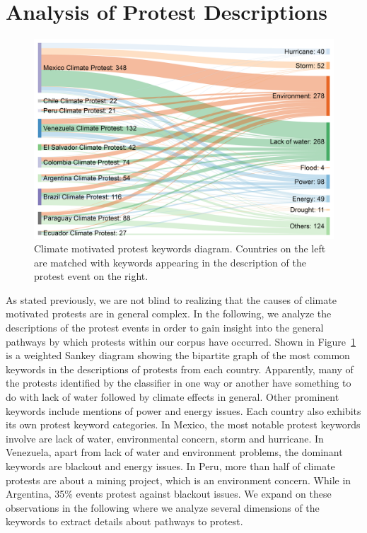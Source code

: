 \documentclass[9pt,twocolumn,twoside]{pnas-new}
\begin{document}
\section{Analysis of Protest Descriptions}
\begin{figure}[t]
\centerline
{\includegraphics[width=.4\textwidth]{figures/causality1}}
\caption{Climate motivated protest keywords diagram. Countries on the left are matched with keywords appearing in the description of the protest event on the right.}
\label{causality}
\end{figure}


As stated previously, we are not blind to realizing that the causes of climate motivated protests are in general complex.
In the following, we analyze the descriptions of the protest events in order to gain insight into the general pathways by which protests within our corpus have occurred.
Shown in Figure~\ref{causality} is a weighted Sankey diagram showing the bipartite graph of the most common keywords in the descriptions of protests from each country.
Apparently, many of the protests identified by the classifier in one way or another have something to do with lack of water followed by climate effects in general.
Other prominent keywords include mentions of power and energy issues.
Each country also exhibits its own protest keyword categories.
In Mexico, the most notable protest keywords involve are lack of water, environmental concern, storm and hurricane.
In Venezuela, apart from lack of water and environment problems, the dominant keywords are blackout and energy issues.
In Peru, more than half of climate protests are about a mining project, which is an environment concern.
While in Argentina, 35\% events protest against blackout issues.
We expand on these observations in the following where we analyze several dimensions of the keywords to extract details about pathways to protest.
\end{document}
